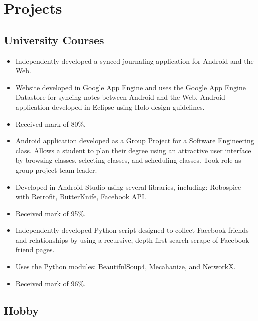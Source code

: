 \documentclass[11pt,letterpaper,sans]{moderncv}        %
\begin{document}
\section{Projects}
\subsection{University Courses}
{
  \begin{itemize}
    \item Independently developed a synced journaling application for Android and the Web.
    \item Website developed in Google App Engine and uses the Google App Engine Datastore for syncing notes between Android and the Web. Android application developed in Eclipse using Holo design guidelines.
    \item Received mark of 80\%.
  \end{itemize}
}

{
  \begin{itemize}
    \item Android application developed as a Group Project for a Software Engineering class. Allows a student to plan their degree using an attractive user interface by browsing classes, selecting classes, and scheduling classes. Took role as group project team leader.
    \item Developed in Android Studio using several libraries, including: Robospice with Retrofit, ButterKnife, Facebook API.
    \item Received mark of 95\%.
  \end{itemize}
}

{
  \begin{itemize}
    \item Independently developed Python script designed to collect Facebook friends and relationships by using a recursive, depth-first search scrape of Facebook friend pages.
    \item Uses the Python modules: BeautifulSoup4, Mecahanize, and NetworkX.
    \item Received mark of 96\%.
  \end{itemize}
}


\vspace*{-0.5cm} %
\subsection{Hobby}
\end{document}
